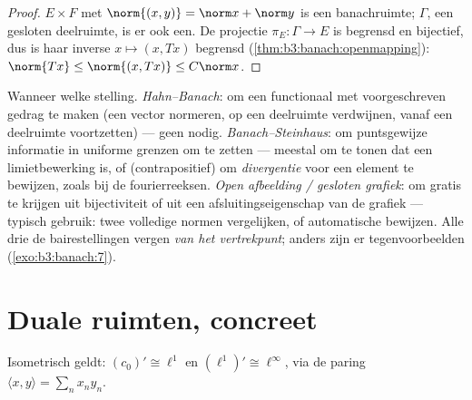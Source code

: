 \begin{proof}
$E \times F$ met $\norm{(x,y)} = \norm x + \norm y$ is een
banachruimte; $\Gamma$, een gesloten deelruimte, is er ook een. De
projectie $\pi_E\colon \Gamma \to E$ is begrensd en bijectief, dus
is haar inverse $x \mapsto (x, Tx)$ begrensd
(\cref{thm:b3:banach:openmapping}): $\norm{Tx} \leq \norm{(x,
Tx)} \leq C\norm x$.
\end{proof}

\begin{method}\label{met:b3:banach:trilogy}
Wanneer welke stelling. \emph{Hahn--Banach}: om een functionaal
met voorgeschreven gedrag te maken (een vector normeren, op een
deelruimte verdwijnen, vanaf een deelruimte voortzetten) --- geen
 nodig. \emph{Banach--Steinhaus}: om puntsgewijze
informatie in uniforme grenzen om te zetten --- meestal om te
tonen dat een limietbewerking  is, of (contrapositief) om
\emph{divergentie} voor een element te bewijzen, zoals bij de
fourierreeksen. \emph{Open afbeelding / gesloten grafiek}: om
 gratis te krijgen uit  bijectiviteit of
uit een afsluitingseigenschap van de grafiek --- typisch gebruik:
twee volledige normen vergelijken, of automatische 
bewijzen. Alle drie de bairestellingen vergen 
\emph{van het vertrekpunt}; anders zijn er tegenvoorbeelden
(\cref{exo:b3:banach:7}).
\end{method}

\section{Duale ruimten, concreet}

\begin{theorem}\label{thm:b3:banach:duals}
Isometrisch geldt: $(c_0)' \cong \ell^1$ en $(\ell^1)' \cong
\ell^\infty$, via de paring $\langle x, y\rangle = \sum_n
x_ny_n$.
\end{theorem}

